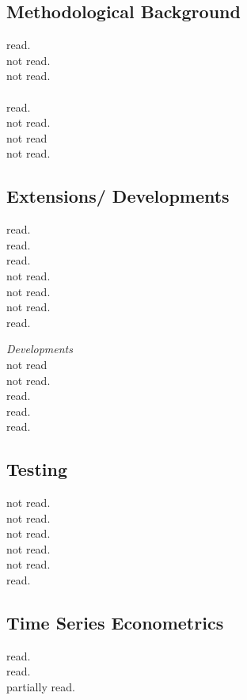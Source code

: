 \subsection{Methodological Background}
\cite{abadie:2011} read.\\
\cite{abadie:2006} not read.\\
\cite{abadie:2002} not read.\\
\cite{doudchenko:2016} \\
\cite{ferman:2021} read.\\
\cite{frangakis:2002} not read.\\
\cite{rosenbaum:1983} not read \\
\cite{rubin:1974} not read.

\subsection{Extensions/ Developments}
\cite{abadie:2019} read.\\
\cite{amjad:2018} read.\\
\cite{benmichael:2021a} read.\\
\cite{benmichael:2021b} not read. \\
\cite{kellog:2021} not read. \\
\cite{kuosmanen:2021} not read.\\
\cite{muhlbach:2019} read.

\textit{Developments}\\
\cite{arkhangelsky:2021} not read\\
\cite{athey:2017} not read.\\
\cite{brodersen:2015} read. \\
\cite{brzeski:2015} read. \\
\cite{hartford:2017} read.

\subsection{Testing}
\cite{andrews:2003} not read. \\
\cite{cattaneo:2021} not read. \\
\cite{chernozhukov:2019} not read.\\
\cite{chernozhukov:2021} not read. \\
\cite{firpo:2018} not read. \\
\cite{hahn:2017} read.

\subsection{Time Series Econometrics}
\cite{martin:2012} read.\\
\cite{harvey:2020} read.\\
\cite{breitung:2021} partially read.

